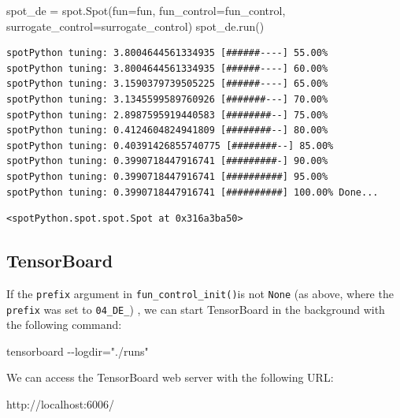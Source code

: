 \documentclass[
  letterpaper,
  DIV=11,
  numbers=noendperiod]{scrreprt}
\newenvironment{Shaded}{\begin{snugshade}}{\end{snugshade}}
\newcommand{\NormalTok}[1]{\textcolor[rgb]{0.00,0.23,0.31}{#1}}
\newcommand{\OperatorTok}[1]{\textcolor[rgb]{0.37,0.37,0.37}{#1}}
\begin{document}
\begin{Shaded}
\begin{Highlighting}[]
\NormalTok{spot\_de }\OperatorTok{=}\NormalTok{ spot.Spot(fun}\OperatorTok{=}\NormalTok{fun,}
\NormalTok{                    fun\_control}\OperatorTok{=}\NormalTok{fun\_control,}
\NormalTok{                    surrogate\_control}\OperatorTok{=}\NormalTok{surrogate\_control)}
\NormalTok{spot\_de.run()}
\end{Highlighting}
\end{Shaded}

\begin{verbatim}
spotPython tuning: 3.8004644561334935 [######----] 55.00% 
spotPython tuning: 3.8004644561334935 [######----] 60.00% 
spotPython tuning: 3.1590379739505225 [######----] 65.00% 
spotPython tuning: 3.1345599589760926 [#######---] 70.00% 
spotPython tuning: 2.8987595919440583 [########--] 75.00% 
spotPython tuning: 0.4124604824941809 [########--] 80.00% 
spotPython tuning: 0.40391426855740775 [########--] 85.00% 
spotPython tuning: 0.3990718447916741 [#########-] 90.00% 
spotPython tuning: 0.3990718447916741 [##########] 95.00% 
spotPython tuning: 0.3990718447916741 [##########] 100.00% Done...
\end{verbatim}

\begin{verbatim}
<spotPython.spot.spot.Spot at 0x316a3ba50>
\end{verbatim}

\subsection{TensorBoard}\label{tensorboard-1}

If the \texttt{prefix} argument in \texttt{fun\_control\_init()}is not
\texttt{None} (as above, where the \texttt{prefix} was set to
\texttt{04\_DE\_}) , we can start TensorBoard in the background with the
following command:

\begin{Shaded}
\begin{Highlighting}[]
\NormalTok{tensorboard {-}{-}logdir="./runs"}
\end{Highlighting}
\end{Shaded}

We can access the TensorBoard web server with the following URL:

\begin{Shaded}
\begin{Highlighting}[]
\NormalTok{http://localhost:6006/}
\end{Highlighting}
\end{Shaded}
\end{document}
